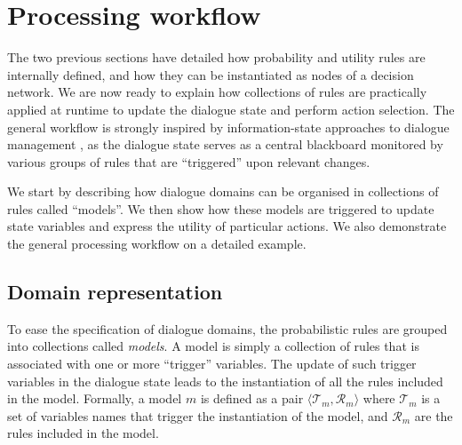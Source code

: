 \section{Processing workflow}
\label{sec:processing-workflow}

The two previous sections have detailed how probability and utility rules are internally defined, and how they can be instantiated as nodes of a decision network. We are now ready to explain how collections of rules are practically applied at runtime to update the dialogue state and perform action selection. The general workflow is strongly inspired by information-state approaches to dialogue management \citep{Larsson:2000:ISD:973935.973943,Buckley:2006}, as the dialogue state serves as a central blackboard monitored by various groups of rules that are ``triggered'' upon relevant changes. 

We start by describing how dialogue domains can be organised in collections of rules called ``models''. We then show how these models are triggered to update state variables and express the utility of particular actions. We also demonstrate the general processing workflow on a detailed example. 


\subsection{Domain representation}

To ease the specification of dialogue domains, the probabilistic rules are grouped into collections called \textit{models}.  A model is simply a collection of rules that is associated with one or more ``trigger'' variables.  The update of such trigger variables in the dialogue state leads to the instantiation of all the rules included in the model. Formally, a model $m$ is defined as a pair $\langle \mathcal{T}_m, \mathcal{R}_m \rangle$ where $\mathcal{T}_m$ is a set of variables names that trigger the instantiation of the model, and $\mathcal{R}_m$ are the rules included in the model.

